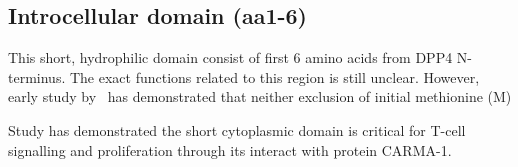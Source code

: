 \subsection{Introcellular domain (aa1-6)}

This short, hydrophilic domain consist of first 6 amino acids from DPP4 N-terminus. The exact functions related to this region is still unclear. However, early study by~\citet{Hong1990} has demonstrated that neither exclusion of initial methionine (M) 

Study has demonstrated the short cytoplasmic domain is critical for T-cell signalling and proliferation through its interact with protein CARMA-1. \cite{Ohnuma_2007}